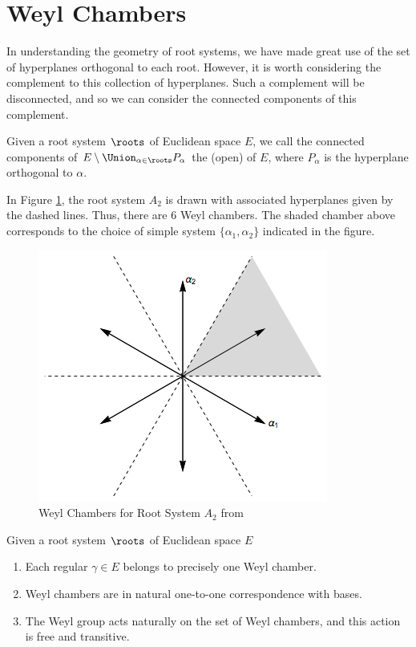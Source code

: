 \documentclass[11pt,leqno,oneside]{amsart}
\numberwithin{thm}{section}
\begin{document}
\section{Weyl Chambers}
In understanding the geometry of root systems, we have made great use
of the set of hyperplanes orthogonal to each root. However, it is
worth considering the complement to this collection of
hyperplanes. Such a complement will be disconnected, and so we can
consider the connected components of this complement.
\begin{defn}
  Given a root system \(\roots\) of Euclidean space \(E\), we call the
  connected components of \(E \setminus \Union_{\alpha \in \roots}
  P_\alpha\) the (open)  of \(E\), where
  \(P_\alpha\) is the hyperplane orthogonal to 
  \(\alpha\). 
\end{defn}
\begin{example}
  In Figure \ref{fig:weyl-chamber-a2}, the root system \(A_2\) is
  drawn with 
  associated hyperplanes given by the dashed lines. Thus, there are
  \(6\) Weyl chambers. The shaded chamber above corresponds to the
  choice of simple system 
  \(\{\alpha_1,\alpha_2\}\) indicated in the figure.
  \begin{figure}
    \includegraphics[scale=0.5]{images/Weyl_chambers_for_A2}
    \caption{Weyl Chambers for Root System \(A_2\) from \cite{wiki2}}
    \label{fig:weyl-chamber-a2}
  \end{figure}
\end{example}
\begin{prop}\label{weyl-chamber-props}
  Given a root system \(\roots\) of Euclidean space \(E\)
  \begin{enumerate}
  \item Each regular \(\gamma \in E\) belongs to precisely one Weyl
    chamber.
  \item Weyl chambers are in natural one-to-one correspondence with
    bases.
  \item The Weyl group acts naturally on the set of Weyl chambers, and
    this action is free and transitive.
  \end{enumerate}
\end{prop}
\end{document}
